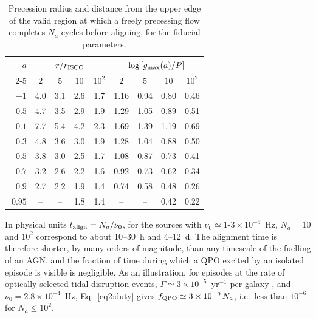 \begin{table}
\caption{Precession radius and distance from the upper edge of the valid region at which a freely precessing flow completes $N_a$ cycles before aligning, for the fiducial parameters.}
\label{tab:Na}
\centering
\begin{tabular}{rcccccccc}
\hline\hline
$a$ & \multicolumn{4}{c}{$\bar r/r_\textup{ISCO}$} & \multicolumn{4}{c}{$\log\left[g_\textup{max}(a)/P\right]$} \\
\cline{2-5} \cline{6-9}
 & $2$ & $5$ & $10$ & $10^2$ & $2$ & $5$ & $10$ & $10^2$ \\
\hline
$-1$    & 4.0 & 3.1 & 2.6 & 1.7 & 1.16 & 0.94 & 0.80 & 0.46 \\
$-0.5$  & 4.7 & 3.5 & 2.9 & 1.9 & 1.29 & 1.05 & 0.89 & 0.51 \\
$0.1$   & 7.7 & 5.4 & 4.2 & 2.3 & 1.69 & 1.39 & 1.19 & 0.69 \\
$0.3$   & 4.8 & 3.6 & 3.0 & 1.9 & 1.28 & 1.04 & 0.88 & 0.50 \\
$0.5$   & 3.8 & 3.0 & 2.5 & 1.7 & 1.08 & 0.87 & 0.73 & 0.41 \\
$0.7$   & 3.2 & 2.6 & 2.2 & 1.6 & 0.92 & 0.73 & 0.62 & 0.34 \\
$0.9$   & 2.7 & 2.2 & 1.9 & 1.4 & 0.74 & 0.58 & 0.48 & 0.26 \\
$0.95$  & --  & --  & 1.8 & 1.4 & --   & --   & 0.42 & 0.22 \\
\hline
\end{tabular}
\end{table}

In physical units $t_\textup{align}=N_a/\nu_0$,
for the sources with $\nu_0\simeq1$-$3\times10^{-4}$~Hz, $N_a=10$ and $10^2$ correspond to about 10--30~h and 4--12~d.
The alignment time is therefore shorter, by many orders of magnitude, than any timescale of the fuelling of an AGN, and the fraction of time during which a QPO excited by an isolated episode is visible is negligible.
As an illustration, for episodes at the rate of optically selected tidal disruption events, $\Gamma\simeq3\times10^{-5}$~yr$^{-1}$ per galaxy \citep{Yao2023}, and $\nu_0=2.8\times10^{-4}$~Hz, Eq.~\eqref{eq2:duty} gives $f_\textup{QPO}\simeq3\times10^{-9}\,N_a$, i.e.\ less than $10^{-6}$ for $N_a\leq10^2$.

